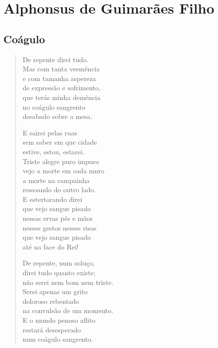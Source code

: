 \documentclass[10pt,a5paper,oneside]{book}
\begin{document}
\part{Alphonsus de Guimarães Filho}

\chapter{Coágulo}

\begin{verse}
De repente direi tudo.\\
Mas com tanta veemência\\
e com tamanha aspereza\\
de expressão e sofrimento,\\
que terás minha demência\\
no coágulo sangrento\\
desabado sobre a mesa.

E sairei pelas ruas\\
sem saber em que cidade\\
estive, estou, estarei.\\
Triste alegre puro impuro\\
vejo a morte em cada muro\\
a morte na campainha\\
ressoando do outro lado.\\
E estertorando direi\\
que vejo sangue pisado\\
nessas ervas pés e mãos\\
nesses gestos nesses risos\\
que vejo sangue pisado\\
até na face do Rei!

De repente, num soluço,\\
direi tudo quanto existe;\\
não serei nem bom nem triste.\\
Serei apenas um grito\\
doloroso rebentado\\
na convulsão de um momento.\\
E o mundo penoso aflito\\
restará desesperado\\
num coágulo sangrento.
\end{verse}
\end{document}
